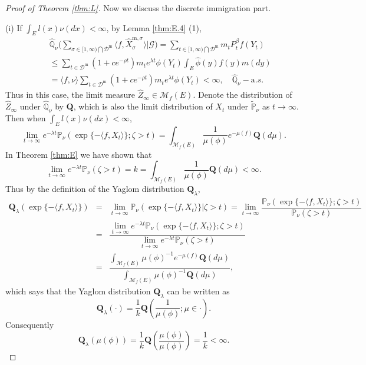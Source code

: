 \documentclass[12pt,a4paper]{amsart}
\numberwithin{equation}{section}
\theoremstyle{plain}
\theoremstyle{definition}
\theoremstyle{remark}
\begin{document}
\begin{proof}[Proof of Theorem \ref{thm:L}]
Now we discuss the discrete immigration part.


(i) If  $\int_E l(x) \nu(dx)<\infty$,
 by Lemma \ref{thm:E.4} (1),
\begin{eqnarray*}
&&\widehat{\mathbb Q}_{\nu}\Big(\sum_{\sigma\in [1,\infty)\bigcap\mathcal D^{\mathrm m}}\langle f, \widehat X_{\sigma}^{{\mathrm m},\sigma} \rangle\Big|\mathcal G \Big)
=\sum_{t\in [1,\infty)\bigcap\mathcal D^{\mathrm m}}m_tP^{\beta}_tf( Y_t)\\
&&\leq \sum_{t\in \mathcal D^{\mathrm m}}(1+ce^{-\rho t})m_te^{\lambda t}
\phi(Y_t)
\int_E\widehat\phi(y)f(y)m(dy)\\
&&=\langle f,\nu\rangle
\sum_{t\in \mathcal D^{\mathrm m}}(1+ce^{-\rho t})m_te^{\lambda t}\phi(Y_t)<\infty,\quad \widehat{\mathbb Q}_{\nu}-{\mathrm a.s.}
\end{eqnarray*}
 Thus in this case, the limit measure $\widehat Z_\infty\in \mathcal M_f(E)$.  Denote the distribution of $\widehat Z_\infty$ under
  $\widehat{\mathbb Q}_{\nu}$ by $\mathbf Q$, which is also the limit distribution of $X_t$ under $\widetilde{\mathbb P}_\nu$ as $t\to\infty$.  Then when
$\int_E l(x)\nu(dx)<\infty$,
\[
\lim_{t\rightarrow\infty}e^{-\lambda t}\mathbb P_\nu\left(\exp\{-\langle f, X_t\rangle \};\zeta>t\right)=
\int_{{\mathcal M}_f(E)}\frac{1}{\mu(\phi)}e^{-\mu(f)}\mathbf Q(d\mu).
\]
In Theorem \ref{thm:E} we have shown that
\[
\lim_{t\rightarrow\infty}e^{-\lambda t}\mathbb P_\nu(\zeta>t)=k
=\int_{{\mathcal M}_f(E)}\frac{1}{\mu(\phi)}\mathbf Q(d\mu)<\infty.
\]
Thus by the definition of the Yaglom distribution ${\mathbf Q}_\lambda $,
\begin{eqnarray*}
\mathbf Q_\lambda(\exp\{-\langle f, X_t\rangle \})&=&\lim_{t\rightarrow\infty}\mathbb P_\nu\left(\exp\{-\langle f, X_t\rangle \}\Big|\zeta>t\right)=\lim_{t\rightarrow\infty}\dfrac{\mathbb P_\nu\left(\exp\{-\langle f, X_t\rangle \};\zeta>t\right)}{\mathbb P_\nu(\zeta>t)}\\
&=&\dfrac{\lim_{t\rightarrow\infty}e^{-\lambda t}\mathbb P_\nu\left(\exp\{-\langle f, X_t\rangle \};\zeta>t\right)}{\lim_{t\rightarrow\infty}e^{-\lambda t}\mathbb P_\nu(\zeta>t)}\\
&=&\dfrac{\int_{{\mathcal M}_f(E)}\mu(\phi)^{-1}e^{-\mu(f)}\mathbf Q(d\mu)}{\int_{{\mathcal M}_f(E)}\mu(\phi)^{-1}\mathbf Q(d\mu)},
\end{eqnarray*}
which says that the Yaglom distribution ${\mathbf Q}_\lambda$ can be written as
\begin{equation}\label{rep: yaglom}
\mathbf Q_\lambda(\cdot)=\dfrac{1}{k}{\mathbf Q}\left(\dfrac{1}{\mu(\phi)}; \mu\in\cdot\right).
\end{equation}
Consequently
\begin{equation}\label{ident: k}
\mathbf Q_\lambda(\mu(\phi))=\dfrac{1}{k}{\mathbf Q}\left(\dfrac{\mu(\phi)}{\mu(\phi) }\right)=\dfrac{1}{k}<\infty.
\end{equation}



\end{proof}
\end{document}
